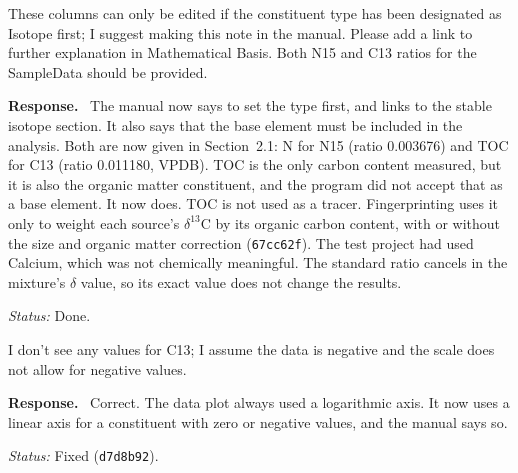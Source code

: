 \documentclass[11pt]{article}
\newcommand{\commit}[1]{\texttt{#1}}
\newcounter{cmt}
\newcounter{grp}
\renewcommand{\thecmt}{\thegrp.\arabic{cmt}}
\newenvironment{reviewer}[1]{%
  \refstepcounter{cmt}%
  \begin{tcolorbox}[enhanced,breakable,colback=commentbg,colframe=usgsgreen!60,
    boxrule=0.4pt,left=6pt,right=6pt,top=4pt,bottom=4pt,
    title={\small\textbf{Comment \thecmt}\hfill\textit{#1}},
    coltitle=black,colbacktitle=usgsgreen!15,fonttitle=\small]}%
  {\end{tcolorbox}}
\newenvironment{response}{\par\noindent\textbf{Response.}\ }{\par\medskip}
\newcommand{\status}[1]{\par\noindent\textit{Status:} #1\par}
\begin{document}
\begin{reviewer}{Importing the data}
These columns can only be edited if the constituent type has been designated as
Isotope first; I suggest making this note in the manual. Please add a link to
further explanation in Mathematical Basis. Both N15 and C13 ratios for the
SampleData should be provided.
\end{reviewer}
\begin{response}
The manual now says to set the type first, and links to the stable isotope
section. It also says that the base element must be included in the analysis.
Both are now given in Section~2.1: N for N15 (ratio 0.003676) and TOC for C13
(ratio 0.011180, VPDB). TOC is the only carbon content measured, but it is also
the organic matter constituent, and the program did not accept that as a base
element. It now does. TOC is not used as a tracer. Fingerprinting uses it only
to weight each source's $\delta^{13}$C by its organic carbon content, with or
without the size and organic matter correction (\commit{67cc62f}). The
test project had used Calcium, which was not chemically meaningful. The
standard ratio cancels in the mixture's $\delta$ value, so its exact value does
not change the results.
\end{response}
\status{Done.}

\begin{reviewer}{Importing the data}
I don't see any values for C13; I assume the data is negative and the scale
does not allow for negative values.
\end{reviewer}
\begin{response}
Correct. The data plot always used a logarithmic axis. It now uses a linear
axis for a constituent with zero or negative values, and the manual says so.
\end{response}
\status{Fixed (\commit{d7d8b92}).}
\end{document}
